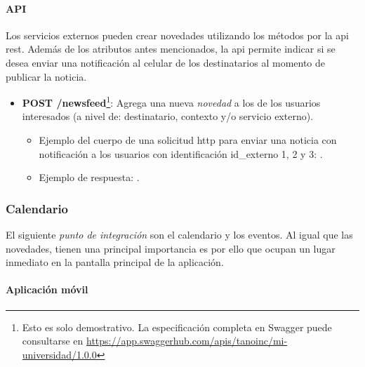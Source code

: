 \paragraph{API}
\label{funcionalidad_noticias_api}

Los servicios externos pueden crear novedades utilizando los métodos por la \gls{api} \gls{rest}. 
Además de los atributos antes mencionados, la \gls{api} permite indicar si se desea enviar una notificación  al celular de los destinatarios al momento de publicar la noticia.

\begin{itemize}
\item \textbf{POST /newsfeed}\footnote{Esto es solo demostrativo. La especificación completa en Swagger puede consultarse en \url{https://app.swaggerhub.com/apis/tanoinc/mi-universidad/1.0.0}}: Agrega una nueva \textit{novedad} a los  de los usuarios interesados (a nivel de: destinatario, contexto y/o servicio externo).
\begin{itemize}
\item Ejemplo del cuerpo de una solicitud \gls{http} para enviar una noticia con notificación a los usuarios con identificación id\_externo 1, 2 y 3:
\begingroup
  .\label{codigo_post_newsfeed_solicitud}
\endgroup

\item Ejemplo de respuesta:
\begingroup
  .\label{codigo_post_newsfeed_respuesta}
\endgroup
\end{itemize}
\end{itemize}

\subsubsection{Calendario}
\label{funcionalidad_calendario}

El siguiente \textit{punto de integración} son el calendario y los eventos. Al igual que las novedades, tienen una principal importancia es por ello que ocupan un lugar inmediato en la pantalla principal de la aplicación. 

\paragraph{Aplicación móvil}
\label{funcionalidad_calendario_app}



